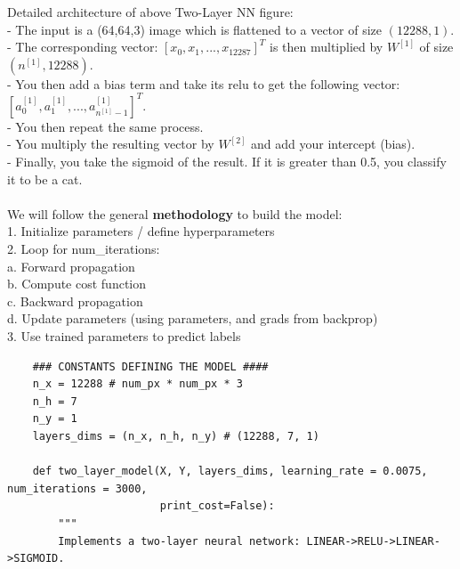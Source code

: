 \documentclass[11pt, a4paper]{article}
\begin{document}
\begin{spacing}{1.1}
	\noindent Detailed architecture of above Two-Layer NN figure: \\
	\hspace*{3mm} - The input is a (64,64,3) image which is flattened to a vector of size $(12288,1)$.  \\
	\hspace*{3mm} - The corresponding vector: $[x_0,x_1,...,x_{12287}]^T$ is then multiplied by $W^{[1]}$ of size $(n^{[1]}, 12288)$. \\
	\hspace*{3mm} - You then add a bias term and take its relu to get the following vector: $[a_0^{[1]}, a_1^{[1]},..., a_{n^{[1]}-1}^{[1]}]^T$. \\
	\hspace*{3mm} - You then repeat the same process. \\
	\hspace*{3mm} - You multiply the resulting vector by $W^{[2]}$ and add your intercept (bias).  \\
	\hspace*{3mm} - Finally, you take the sigmoid of the result. If it is greater than 0.5, you classify it to be a cat. \\~\\
	We will follow the general \textbf{methodology} to build the model: \\
	\hspace*{3mm} 1. Initialize parameters / define hyperparameters \\
	\hspace*{3mm} 2. Loop for num\_iterations: \\
	\hspace*{7mm} a. Forward propagation \\
	\hspace*{7mm} b. Compute cost function \\
	\hspace*{7mm} c. Backward propagation \\
	\hspace*{7mm} d. Update parameters (using parameters, and grads from backprop)  \\
	\hspace*{3mm} 3. Use trained parameters to predict labels
	\begin{lstlisting}
	### CONSTANTS DEFINING THE MODEL ####
	n_x = 12288 # num_px * num_px * 3
	n_h = 7
	n_y = 1
	layers_dims = (n_x, n_h, n_y) # (12288, 7, 1)
	
	def two_layer_model(X, Y, layers_dims, learning_rate = 0.0075, num_iterations = 3000, 
	                    print_cost=False):
		"""
		Implements a two-layer neural network: LINEAR->RELU->LINEAR->SIGMOID.
		

\end{lstlisting}
\end{spacing}
\end{document}
